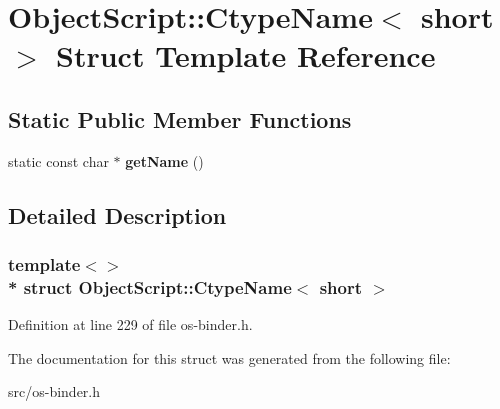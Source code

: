 \hypertarget{struct_object_script_1_1_ctype_name_3_01short_01_4}{}\section{Object\+Script\+:\+:Ctype\+Name$<$ short $>$ Struct Template Reference}
\label{struct_object_script_1_1_ctype_name_3_01short_01_4}
\subsection*{Static Public Member Functions}
\begin{DoxyCompactItemize}
\item 
static const char $\ast$ {\bfseries get\+Name} ()\hypertarget{struct_object_script_1_1_ctype_name_3_01short_01_4_af2efe001418e294f7d8cea0baafa5ec0}{}\label{struct_object_script_1_1_ctype_name_3_01short_01_4_af2efe001418e294f7d8cea0baafa5ec0}

\end{DoxyCompactItemize}


\subsection{Detailed Description}
\subsubsection*{template$<$$>$\\*
struct Object\+Script\+::\+Ctype\+Name$<$ short $>$}



Definition at line 229 of file os-\/binder.\+h.



The documentation for this struct was generated from the following file\+:\begin{DoxyCompactItemize}
\item 
src/os-\/binder.\+h\end{DoxyCompactItemize}
